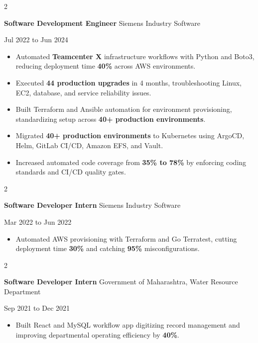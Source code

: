 \documentclass[10pt, letterpaper]{article}
\newenvironment{highlights}{
    \begin{itemize}[
        topsep=0.10 cm,
        parsep=0.06 cm,
        partopsep=0pt,
        itemsep=0.06 cm,
        leftmargin=12pt
    ]
}{
    \end{itemize}
}
\newenvironment{twocolentry}[2][]{
    \onecolentry
    \def\secondColumn{#2}
    \setcolumnwidth{\fill, 4.5 cm}
    \begin{paracol}{2}
}{
    \switchcolumn \raggedleft \secondColumn
    \end{paracol}
    \endonecolentry
}
\begin{document}
\begin{twocolentry}{Jul 2022 to Jun 2024}
\textbf{Software Development Engineer} \textbar{} Siemens Industry Software
\end{twocolentry}
\begin{highlights}
  \item Automated \textbf{Teamcenter X} infrastructure workflows with Python and Boto3, reducing deployment time \textbf{40\%} across AWS environments.
  \item Executed \textbf{44 production upgrades} in 4 months, troubleshooting Linux, EC2, database, and service reliability issues.
  \item Built Terraform and Ansible automation for environment provisioning, standardizing setup across \textbf{40+ production environments}.
  \item Migrated \textbf{40+ production environments} to Kubernetes using ArgoCD, Helm, GitLab CI/CD, Amazon EFS, and Vault.
  \item Increased automated code coverage from \textbf{35\% to 78\%} by enforcing coding standards and CI/CD quality gates.
\end{highlights}

\vspace{0.15 cm}

\begin{twocolentry}{Mar 2022 to Jun 2022}
\textbf{Software Developer Intern} \textbar{} Siemens Industry Software
\end{twocolentry}
\begin{highlights}
  \item Automated AWS provisioning with Terraform and Go Terratest, cutting deployment time \textbf{30\%} and catching \textbf{95\%} misconfigurations.
\end{highlights}

\vspace{0.15 cm}

\begin{twocolentry}{Sep 2021 to Dec 2021}
\textbf{Software Developer Intern} \textbar{} Government of Maharashtra, Water Resource Department
\end{twocolentry}
\begin{highlights}
  \item Built React and MySQL workflow app digitizing record management and improving departmental operating efficiency by \textbf{40\%}.
\end{highlights}
\end{document}
